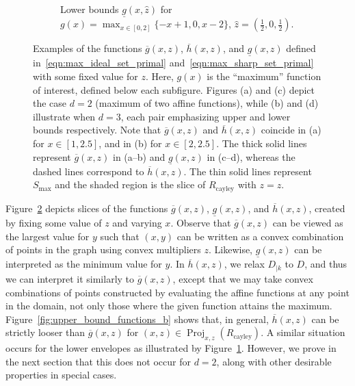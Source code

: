 \documentclass[smallextended]{svjour3}
\newcommand{\blue}[1]{{#1}}
\newcommand{\Proj}{\operatorname{Proj}}
\newcommand{\Rcayley}{R_{\operatorname{cayley}}}
\newcommand{\Smax}{S_{\operatorname{max}}}
\newcommand{\ubar}[1]{\underline{#1}}
\renewcommand{\bar}[1]{\overline{#1}}
\begin{document}
\begin{figure}
\begin{subfigure}[t]{0.49\textwidth}
    \caption{Lower bounds $\ubar{g}(x,\hat{z})$ for\\[0.5em] \centering$\blue{g(x) =\!}\displaystyle\max_{x \in [0,2]}\{-x+1, 0, x-2\}$, $\hat{z} = \left(\frac{1}{2},0,\frac{1}{2}\right)$.}\label{fig:lower_bound_functions_b}
    \end{subfigure}
        \caption{Examples of the functions $\bar{g}(x,z)$, $\bar{h}(x,z)$, and $\ubar{g}(x,z)$ defined in~\eqref{eqn:max_ideal_set_primal} and~\eqref{eqn:max_sharp_set_primal} with some fixed value for $z$. \blue{Here, $g(x)$ is the ``maximum'' function of interest, defined below each subfigure. Figures (a) and (c) depict the case $d = 2$ (maximum of two affine functions), while (b) and (d) illustrate when $d = 3$, each pair emphasizing upper and lower bounds respectively.} Note that $\bar{g}(x,z)$ and $\bar{h}(x,z)$ coincide in (a) for $x \in [1,2.5]$, and in (b) for $x \in [2,2.5]$. The thick solid lines represent $\bar{g}(x,z)$ in (a--b) and $\ubar{g}(x,z)$ in (c--d), whereas the dashed lines correspond to $\bar{h}(x,z)$. The thin solid lines represent $\Smax$ and the shaded region is the slice of $\Rcayley$ with $z=\hat{z}$.}
    \label{fig:upper_bound_functions}
\end{figure}

Figure~\ref{fig:upper_bound_functions} depicts slices of the functions $\bar{g}(x,z)$, $\ubar{g}(x,z)$, and $\bar{h}(x,z)$, created by fixing some value of $z$ and varying $x$. Observe that $\bar{g}(x,z)$ can be viewed as the largest value for $y$ such that $(x,y)$ can be written as a convex combination of points in the graph using convex multipliers $z$. Likewise, $\ubar{g}(x,z)$ can be interpreted as the minimum value for $y$. In $\bar{h}(x,z)$, we relax $D_{|k}$ to $D$, and thus we can interpret it similarly to $\bar{g}(x,z)$, except that we may take convex combinations of points constructed by evaluating the affine functions at any point in the domain, not only those where the given function attains the maximum.  Figure~\ref{fig:upper_bound_functions_b} shows that, in general, $\bar{h}(x,z)$ can be strictly looser than $\bar{g}(x,z)$ for $(x,z) \in \Proj_{x,z}(\Rcayley)$. A similar situation occurs for the lower envelopes as illustrated by Figure~\ref{fig:lower_bound_functions_b}. However, we prove in the next section that this does not occur for $d = 2$, along with other desirable properties in special cases.%
\end{document}
